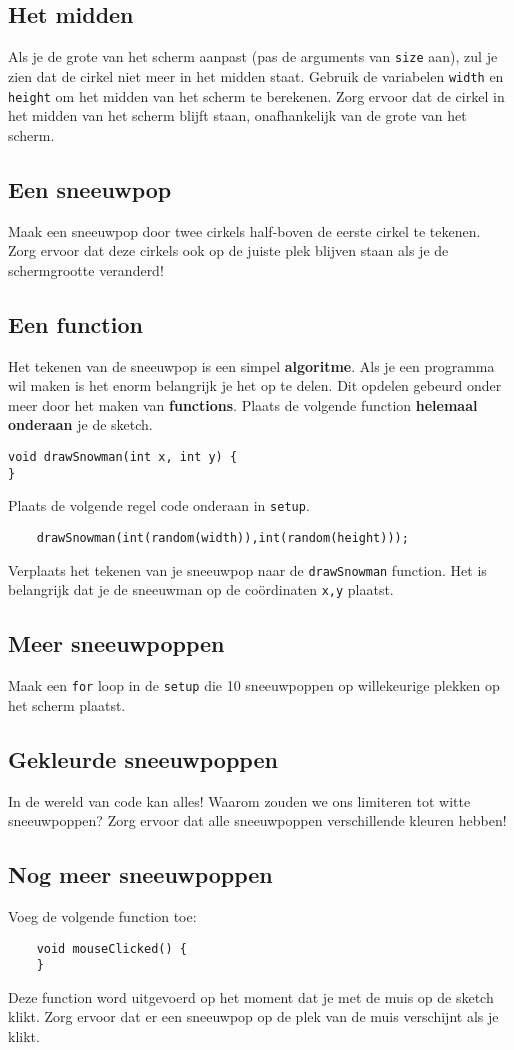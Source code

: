 \documentclass{../qh_exercise}
\begin{document}
\subsection{Het midden}
Als je de grote van het scherm aanpast (pas de arguments van \texttt{size} aan), zul je zien dat de cirkel niet meer in het midden staat.
Gebruik de variabelen \texttt{width} en \texttt{height} om het midden van het scherm te berekenen. Zorg ervoor dat de cirkel in het midden van het scherm blijft staan, onafhankelijk van de grote van het scherm.
\subsection{Een sneeuwpop}
Maak een sneeuwpop door twee cirkels half-boven de eerste cirkel te tekenen. Zorg ervoor dat deze cirkels ook op de juiste plek blijven staan als je de schermgrootte veranderd!
\subsection{Een function}
Het tekenen van de sneeuwpop is een simpel \textbf{algoritme}. Als je een programma wil maken is het enorm belangrijk je het op te delen. Dit opdelen gebeurd onder meer door het maken van \textbf{functions}. Plaats de volgende function \textbf{helemaal onderaan} je de sketch.
\begin{lstlisting}
void drawSnowman(int x, int y) {
}
\end{lstlisting}
Plaats de volgende regel code onderaan in \texttt{setup}.
\begin{lstlisting}
    drawSnowman(int(random(width)),int(random(height)));
\end{lstlisting}
Verplaats het tekenen van je sneeuwpop naar de \texttt{drawSnowman} function. Het is belangrijk dat je de sneeuwman op de co\"ordinaten \texttt{x,y} plaatst.

\subsection{Meer sneeuwpoppen}
Maak een \texttt{for} loop in de \texttt{setup} die 10 sneeuwpoppen op willekeurige plekken op het scherm plaatst.
\subsection{Gekleurde sneeuwpoppen}
In de wereld van code kan alles! Waarom zouden we ons limiteren tot witte sneeuwpoppen?
Zorg ervoor dat alle sneeuwpoppen verschillende kleuren hebben!
\subsection{Nog meer sneeuwpoppen}
Voeg de volgende function toe:
\begin{lstlisting}
    void mouseClicked() {
    }
\end{lstlisting}
Deze function word uitgevoerd op het moment dat je met de muis op de sketch klikt. Zorg ervoor dat er een sneeuwpop op de plek van de muis verschijnt als je klikt. 
\end{document}
